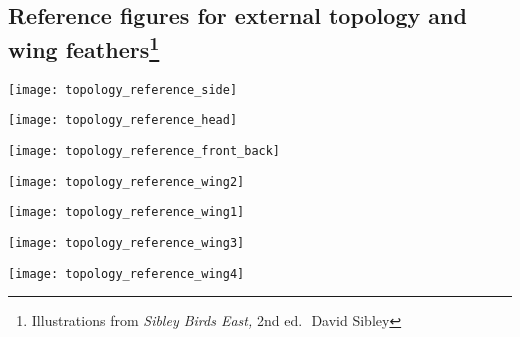 \documentclass[10pt]{article}
\begin{document}
\thispagestyle{plain}

\subsection*{Reference figures for external topology and wing feathers\footnote{Illustrations from \textit{Sibley Birds East,} 2nd ed.~\textcopyright\,David Sibley}}

\texttt{[image: topology\_reference\_side]}

\newpage

\texttt{[image: topology\_reference\_head]}

\texttt{[image: topology\_reference\_front\_back]}

\texttt{[image: topology\_reference\_wing2]}

\texttt{[image: topology\_reference\_wing1]}

\texttt{[image: topology\_reference\_wing3]}



\texttt{[image: topology\_reference\_wing4]}
\end{document}
